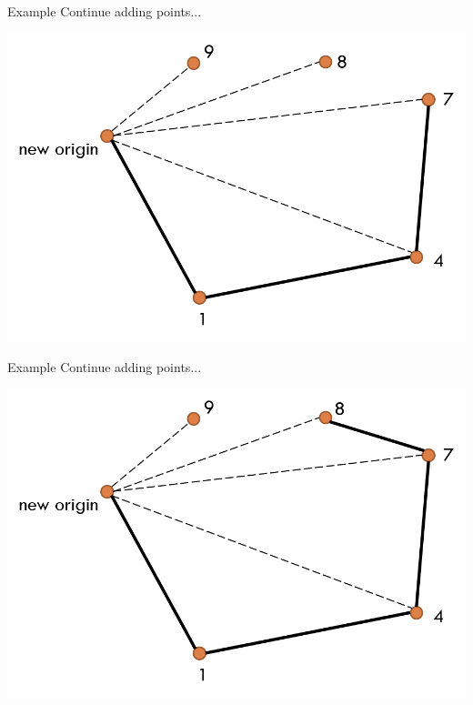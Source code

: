 \documentclass[13pt,onlymath]{beamer}
\begin{document}
\begin{frame}{Example}
Continue adding points...
\begin{center}
\includegraphics[height=0.5\textheight]{figures/graham11}
\end{center}
\end{frame}

\begin{frame}{Example}
Continue adding points...
\begin{center}
\includegraphics[height=0.5\textheight]{figures/graham12}
\end{center}
\end{frame}
\end{document}
